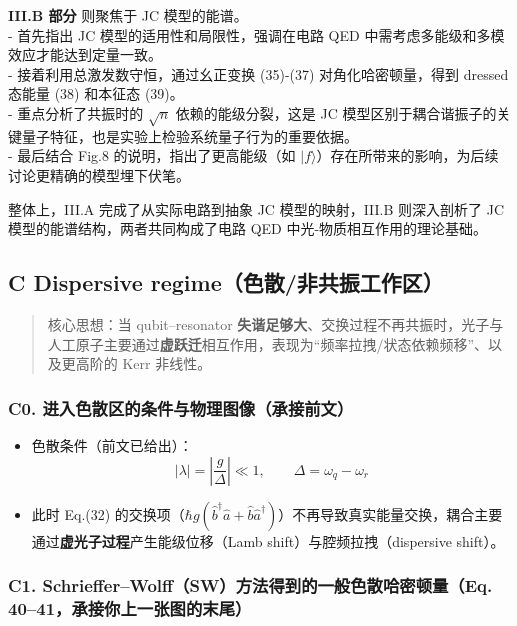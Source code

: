 \documentclass[12pt,a4paper,oneside]{ctexbook}
\providecommand{\tightlist}{%
  \setlength{\itemsep}{0pt}\setlength{\parskip}{0pt}}
\begin{document}
\textbf{III.B 部分} 则聚焦于 JC 模型的能谱。\\
- 首先指出 JC 模型的适用性和局限性，强调在电路 QED
中需考虑多能级和多模效应才能达到定量一致。\\
- 接着利用总激发数守恒，通过幺正变换 (35)-(37) 对角化哈密顿量，得到
dressed 态能量 (38) 和本征态 (39)。\\
- 重点分析了共振时的 \(\sqrt{n}\) 依赖的能级分裂，这是 JC
模型区别于耦合谐振子的关键量子特征，也是实验上检验系统量子行为的重要依据。\\
- 最后结合 Fig.8 的说明，指出了更高能级（如
\(|f\rangle\)）存在所带来的影响，为后续讨论更精确的模型埋下伏笔。

整体上，III.A 完成了从实际电路到抽象 JC 模型的映射，III.B 则深入剖析了
JC 模型的能谱结构，两者共同构成了电路 QED 中光-物质相互作用的理论基础。

\subsection{C Dispersive
regime（色散/非共振工作区）}
\begin{quote}
核心思想：当 qubit--resonator
\textbf{失谐足够大}、交换过程不再共振时，光子与人工原子主要通过\textbf{虚跃迁}相互作用，表现为``频率拉拽/状态依赖频移''、以及更高阶的
Kerr 非线性。
\end{quote}

\subsubsection{\texorpdfstring{\textbf{C0.
进入色散区的条件与物理图像（承接前文）}}{C0. 进入色散区的条件与物理图像（承接前文）}}\label{c0.-ux8fdbux5165ux8272ux6563ux533aux7684ux6761ux4ef6ux4e0eux7269ux7406ux56feux50cfux627fux63a5ux524dux6587}

\begin{itemize}
\tightlist
\item
  色散条件（前文已给出）：\\
  \[
  |\lambda|=\left|\frac{g}{\Delta}\right|\ll 1,\qquad \Delta=\omega_q-\omega_r
  \]
\item
  此时 Eq.(32)
  的交换项（\(\hbar g(\hat b^\dagger\hat a+\hat b\hat a^\dagger)\)）不再导致真实能量交换，耦合主要通过\textbf{虚光子过程}产生能级位移（Lamb
  shift）与腔频拉拽（dispersive shift）。
\end{itemize}


\subsubsection{\texorpdfstring{\textbf{C1.
Schrieffer--Wolff（SW）方法得到的一般色散哈密顿量（Eq.
40--41，承接你上一张图的末尾）}}{C1. Schrieffer--Wolff（SW）方法得到的一般色散哈密顿量（Eq. 40--41，承接你上一张图的末尾）}}\label{c1.-schriefferwolffswux65b9ux6cd5ux5f97ux5230ux7684ux4e00ux822cux8272ux6563ux54c8ux5bc6ux987fux91cfeq.-4041ux627fux63a5ux4f60ux4e0aux4e00ux5f20ux56feux7684ux672bux5c3e}
\end{document}

